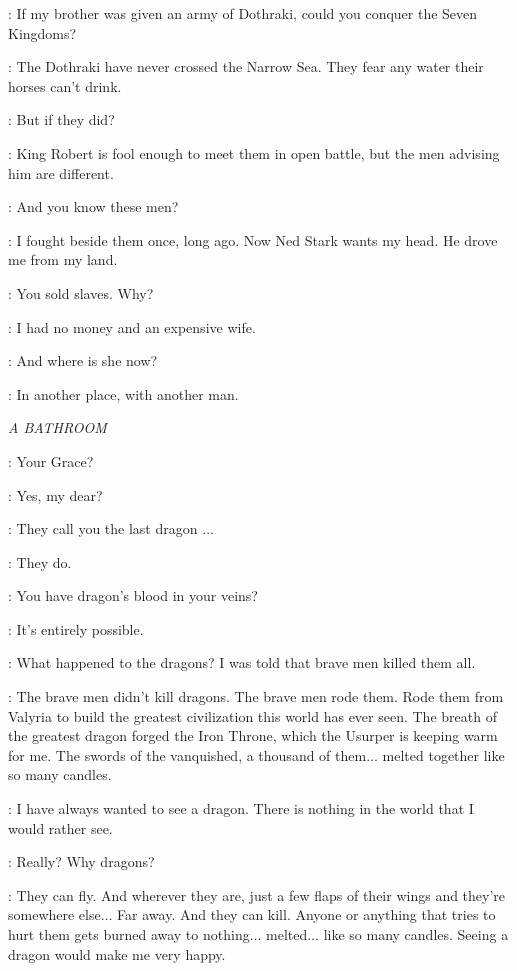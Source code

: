 
\DAENERYS: If my brother was given an army of Dothraki, could you conquer the Seven Kingdoms? 

\JORAH: The Dothraki have never crossed the Narrow Sea. They fear any water their horses can't drink. 

\DAENERYS: But if they did? 

\JORAH: King Robert is fool enough to meet them in open battle, but the men advising him are different. 

\DAENERYS: And you know these men? 

\JORAH: I fought beside them once, long ago. Now Ned Stark wants my head. He drove me from my land. 

\DAENERYS: You sold slaves. Why? 

\JORAH: I had no money and an expensive wife. 

\DAENERYS: And where is she now? 

\JORAH: In another place, with another man. 

\scene

\textit{A BATHROOM}


\DOREAH: Your Grace? 

\VISERYS: Yes, my dear? 

\DOREAH: They call you the last dragon  $\ldots$ 

\VISERYS: They do. 

\DOREAH: You have dragon's blood in your veins? 

\VISERYS: It's entirely possible. 

\DOREAH: What happened to the dragons? I was told that brave men killed them all. 

\VISERYS: The brave men didn't kill dragons. The brave men rode them. Rode them from Valyria to build the greatest civilization this world has ever seen. The breath of the greatest dragon forged the Iron Throne, which the Usurper is keeping warm for me. The swords of the vanquished, a thousand of them$\ldots$ melted together like so many candles. 

\DOREAH: I have always wanted to see a dragon. There is nothing in the world that I would rather see. 

\VISERYS: Really? Why dragons? 

\DOREAH: They can fly. And wherever they are, just a few flaps of their wings and they're somewhere else$\ldots$ Far away. And they can kill.  Anyone or anything that tries to hurt them gets burned away to nothing$\ldots$ melted$\ldots$ like so many candles. Seeing a dragon would make me very happy. 

